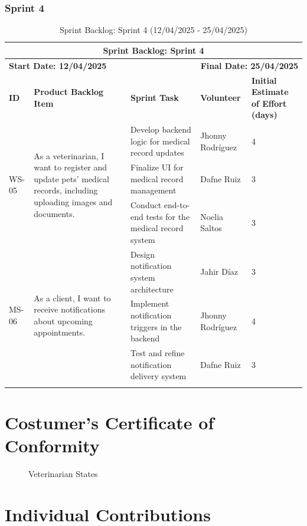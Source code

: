 \documentclass[a4paper,12pt]{report}
\begin{document}
	\subsection{Sprint 4}
	\begin{longtable}{|p{2cm}|p{4cm}|p{5cm}|p{3cm}|p{2cm}|} 
		\hline
		\multicolumn{5}{|c|}{\textbf{Sprint Backlog: Sprint 4}} \\
		\hline
		\multicolumn{2}{|l|}{\textbf{Start Date: 12/04/2025}} & \multicolumn{3}{r|}{\textbf{Final Date: 25/04/2025}} \\
		\hline
		\textbf{ID} & \textbf{Product Backlog Item} & \textbf{Sprint Task} & \textbf{Volunteer} & \textbf{Initial Estimate of Effort (days)} \\
		\hline
		\multirow{3}{*}{WS-05} 
		& \multirow{3}{4cm}{As a veterinarian, I want to register and update pets' medical records, including uploading images and documents.}
		& Develop backend logic for medical record updates & Jhonny Rodríguez & 4 \\
		\cline{3-5}
		& & Finalize UI for medical record management & Dafne Ruiz & 3 \\
		\cline{3-5}
		& & Conduct end-to-end tests for the medical record system & Noelia Saltos & 3 \\
		\hline
		\multirow{3}{*}{MS-06} 
		& \multirow{3}{4cm}{As a client, I want to receive notifications about upcoming appointments.}
		& Design notification system architecture & Jahir Díaz & 3 \\
		\cline{3-5}
		& & Implement notification triggers in the backend & Jhonny Rodríguez & 4 \\
		\cline{3-5}
		& & Test and refine notification delivery system & Dafne Ruiz & 3 \\
		\hline
		\caption{Sprint Backlog: Sprint 4 (12/04/2025 - 25/04/2025)}
	\end{longtable}
	
	
	\clearpage


	
	\chapter{Costumer's Certificate of Conformity}
	\begin{figure}[h!]
		\centering

		\caption{Veterinarian States}
		\label{fig:Acceptance Certificate}
	\end{figure}
	\clearpage
	
	\chapter{Individual Contributions}
	
\end{document}
